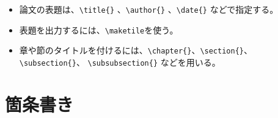 \begin{itemize}
\item 論文の表題は、\verb|\title{}| 、\verb|\author{}| 、\verb|\date{}| などで指定する。
\item 表題を出力するには、\verb|\maketile|を使う。
\item 章や節のタイトルを付けるには、\verb|\chapter{}|、\verb|\section{}|、 \verb|\subsection{}|、 \verb|\subsubsection{}| などを用いる。
\end{itemize}

\section{箇条書き}
\label{sec:latex:itemize}

